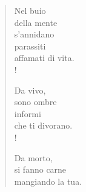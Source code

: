 
\begin{verse}
    Nel buio\\
    della mente\\
    s'annidano\\
    parassiti\\
    affamati di vita.\\!

    Da vivo,\\
    sono ombre\\
    informi\\
    che ti divorano.\\!

    Da morto,\\
    si fanno carne\\
    mangiando la tua.
    
\end{verse}